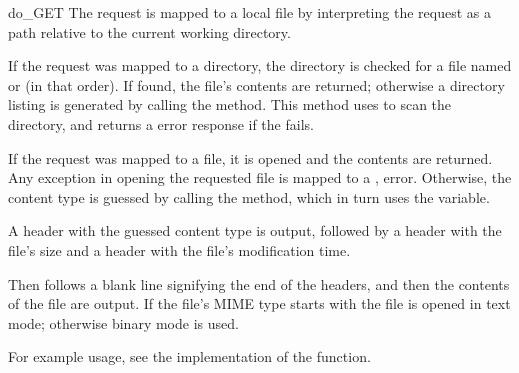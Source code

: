 \begin{methoddesc}{do_GET}{}
The request is mapped to a local file by interpreting the request as
a path relative to the current working directory.

If the request was mapped to a directory, the directory is checked for
a file named  or  (in that order).
If found, the file's contents are returned; otherwise a directory
listing is generated by calling the  method.
This method uses  to scan the directory, and
returns a  error response if the  fails.

If the request was mapped to a file, it is opened and the contents are
returned.  Any  exception in opening the requested
file is mapped to a , 
error. Otherwise, the content type is guessed by calling the
 method, which in turn uses the
 variable.

A  header with the guessed content type is
output, followed by a  header with the file's
size and a  header with the file's modification
time.

Then follows a blank line signifying the end of the headers,
and then the contents of the file are output. If the file's MIME type
starts with  the file is opened in text mode; otherwise
binary mode is used.

For example usage, see the implementation of the 
function.
\end{methoddesc}


\begin{seealso}
\end{seealso}
